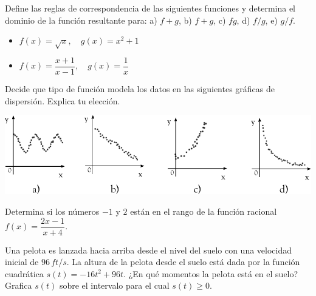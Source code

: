 \documentclass[10pt]{exam}
\begin{document}
\begin{questions}
    
    \question Define las reglas de correspondencia de las siguientes funciones y determina el dominio de la función resultante para: a) $f+g$, b) $f+g$, c) $fg$, d) $f/g$, e) $g/f$.   
    \begin{itemize}
        \item $f(x)=\sqrt{x},\quad g(x)=x^2+1$
        \item $f(x)=\dfrac{x+1}{x-1},\quad g(x)=\dfrac{1}{x}$
    \end{itemize}

    \question Decide que tipo de función modela los datos en las siguientes gráficas de dispersión. Explica tu elección.
    \begin{center}
        \includegraphics[scale=1]{grafdisp.pdf}
    \end{center}
    
    \question Determina si los números $-1$ y $2$ están en el rango de la función racional $f(x)=\dfrac{2x-1}{x+4}$.

    \question Una pelota es lanzada hacia arriba desde el nivel del suelo con una velocidad inicial de $96\, ft/s$. La altura de la pelota desde el suelo está dada por la función cuadrática $s(t)=-16t^2+96t$. ¿En qué momentos la pelota está en el suelo? Grafica $s(t)$ sobre el intervalo para el cual $s(t)\geq0$.

    

\end{questions}
\end{document}
